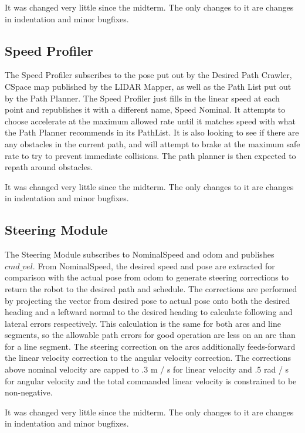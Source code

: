 \documentclass{article}
\begin{document}
It was changed very little since the midterm. The only changes to it are changes in indentation and minor bugfixes.


\subsection{Speed Profiler}

The Speed Profiler subscribes to the pose put out by the Desired Path Crawler, CSpace map published by the LIDAR Mapper, as well as the Path List put out by the Path Planner.
The Speed Profiler just fills in the linear speed at each point and republishes it with a different name, Speed Nominal.
It attempts to choose accelerate at the maximum allowed rate until it matches speed with what the Path Planner recommends in its PathList.
It is also looking to see if there are any obstacles in the current path, and will attempt to brake at the maximum safe rate to try to prevent immediate collisions.
The path planner is then expected to repath around obstacles.

It was changed very little since the midterm. The only changes to it are changes in indentation and minor bugfixes.

\subsection{Steering Module}

The Steering Module subscribes to NominalSpeed and odom and publishes $cmd\_vel$.
From NominalSpeed, the desired speed and pose are extracted for comparison with the actual pose from odom to generate steering corrections to return the robot to the desired path and schedule.
The corrections are performed by projecting the vector from desired pose to actual pose onto both the desired heading and a leftward normal to the desired heading to calculate following and lateral errors respectively.
This calculation is the same for both arcs and line segments, so the allowable path errors for good operation are less on an arc than for a line segment.
The steering correction on the arcs additionally feeds-forward the linear velocity correction to the angular velocity correction.
The corrections above nominal velocity are capped to .3 m / s for linear velocity and .5 rad / s for angular velocity and the total commanded linear velocity is constrained to be non-negative.

It was changed very little since the midterm. The only changes to it are changes in indentation and minor bugfixes.
\end{document}
